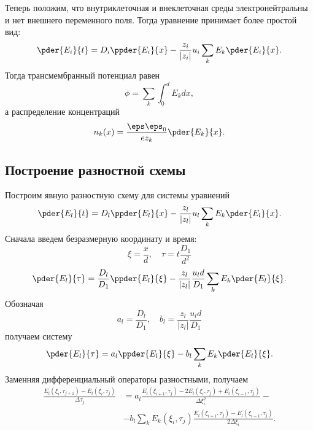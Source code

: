 \documentclass{hedwork}
\begin{document}
    Теперь положим, что внутриклеточная и внеклеточная среды электронейтральны и
    нет внешнего переменного поля. Тогда уравнение принимает более простой вид:
    \begin{equation}
        \pder{E_i}{t} = D_i\ppder{E_i}{x} -
        \frac{z_i}{|z_i|}u_i \sum_{k} E_k \pder{E_i}{x}.
    \end{equation}
    Тогда трансмембранный потенциал равен
    \begin{equation}
        \phi = \sum_k \int_0^d E_k dx,
    \end{equation}
    а распределение концентраций
    \begin{equation}
        n_k(x) = \frac{\eps\eps_0}{ez_k}\pder{E_k}{x}.
    \end{equation}
\subsection{Построение разностной схемы}
    Построим явную разностную схему для системы уравнений
    \begin{equation}
        \pder{E_l}{t} = D_l\ppder{E_l}{x} -
        \frac{z_l}{|z_l|}u_l \sum_{k} E_k \pder{E_l}{x}.
    \end{equation}
    Сначала введем безразмерную координату и время:
    \begin{equation}
        \xi = \frac{x}{d},\quad \tau = t\frac{D_1}{d^2}
    \end{equation}
    \begin{equation}
        \pder{E_l}{\tau} = \frac{D_l}{D_1}\ppder{E_l}{\xi} -
        \frac{z_l}{|z_l|}\frac{u_ld}{D_1} \sum_{k} E_k \pder{E_l}{\xi}.
    \end{equation}
    Обозначая
    \begin{equation}
        a_l = \frac{D_l}{D_1},\quad b_l = \frac{z_l}{|z_l|}\frac{u_ld}{D_1}
    \end{equation}
    получаем систему
    \begin{equation}
        \pder{E_l}{\tau} = a_l\ppder{E_l}{\xi} - b_l\sum_k E_k \pder{E_l}{\xi}.
    \end{equation}
    Заменняя дифференциальный операторы разностными, получаем
    \begin{align*}
        \frac{E_l(\xi_i, \tau_{j+1}) - E_l(\xi_i, \tau_j)}{\Delta\tau_j} & =
        a_l\frac{E_l(\xi_{i+1}, \tau_j) - 2E_l(\xi_i, \tau_j) +
        E_l(\xi_{i-1}, \tau_j)}{\Delta\xi_i^2} -\\
        & -b_l\sum_k E_k(\xi_i, \tau_j)
        \frac{E_l(\xi_{i+1}, \tau_j) - E_l(\xi_{i-1}, \tau_j)}{2\Delta\xi_i}.
    \end{align*}
\end{document}

